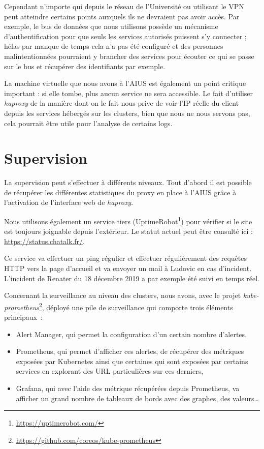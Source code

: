 Cependant n'importe qui depuis le réseau de l'Université ou utilisant le
VPN peut atteindre certains points auxquels ils ne devraient pas avoir
accès. Par exemple, le bus de données que nous utilisons possède un
mécanisme d'authentification pour que seuls les services autorisés
puissent s'y connecter ; hélas par manque de temps cela n'a pas été
configuré et des personnes malintentionnées pourraient y brancher des
services pour écouter ce qui se passe sur le bus et récupérer des
identifiants par exemple.

La machine virtuelle que nous avons à l'AIUS est également un point
critique important : si elle tombe, plus aucun service ne sera
accessible. Le fait d'utiliser \textit{haproxy} de la manière dont on le
fait nous prive de voir l'IP réelle du client depuis les services
hébergés sur les clusters, bien que nous ne nous servons pas, cela
pourrait être utile pour l'analyse de certains logs.

\section{Supervision}

La supervision peut s'effectuer à différents niveaux. Tout d'abord il
est possible de récupérer les différentes statistiques du proxy en place
à l'AIUS grâce à l'activation de l'interface web de \textit{haproxy}.

Nous utilisons également un service tiers
(UptimeRobot\footnote{\url{https://uptimerobot.com/}})
pour vérifier si le site est toujours joignable depuis l'extérieur. Le
statut actuel peut être consulté ici : \url{https://status.chatalk.fr/}.

Ce service va effectuer un ping régulier et effectuer régulièrement des
requêtes HTTP vers la page d'accueil et va envoyer un mail à Ludovic en
cas d'incident. L'incident de Renater du 18 décembre 2019 a par exemple
été suivi en temps réel.

Concernant la surveillance au niveau des clusters, nous avons, avec le
projet
\textit{kube-prometheus}\footnote{
  \url{https://github.com/coreos/kube-prometheus}},
déployé une pile de surveillance qui comporte trois éléments
principaux\ :

\begin{itemize}
\item
  Alert Manager, qui permet la configuration d'un certain nombre
  d'alertes,
\item
  Prometheus, qui permet d'afficher ces alertes, de récupérer des
  métriques exposées par Kubernetes ainsi que certaines qui sont
  exposées par certains services en explorant des URL particulières sur
  ces derniers,
\item
  Grafana, qui avec l'aide des métrique récupérées depuis Prometheus, va
  afficher un grand nombre de tableaux de bords avec des graphes, des
  valeurs\ldots{}
\end{itemize}


